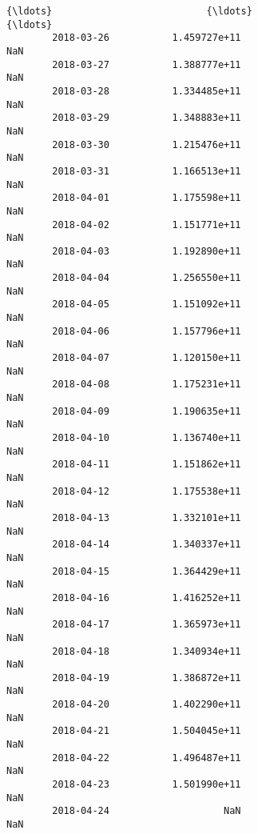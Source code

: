 \documentclass[11pt]{article}
\begin{document}
\begin{Verbatim}[commandchars=\\\{\}]
        {\ldots}                           {\ldots}                                  {\ldots}   
        2018-03-26           1.459727e+11                                  NaN   
        2018-03-27           1.388777e+11                                  NaN   
        2018-03-28           1.334485e+11                                  NaN   
        2018-03-29           1.348883e+11                                  NaN   
        2018-03-30           1.215476e+11                                  NaN   
        2018-03-31           1.166513e+11                                  NaN   
        2018-04-01           1.175598e+11                                  NaN   
        2018-04-02           1.151771e+11                                  NaN   
        2018-04-03           1.192890e+11                                  NaN   
        2018-04-04           1.256550e+11                                  NaN   
        2018-04-05           1.151092e+11                                  NaN   
        2018-04-06           1.157796e+11                                  NaN   
        2018-04-07           1.120150e+11                                  NaN   
        2018-04-08           1.175231e+11                                  NaN   
        2018-04-09           1.190635e+11                                  NaN   
        2018-04-10           1.136740e+11                                  NaN   
        2018-04-11           1.151862e+11                                  NaN   
        2018-04-12           1.175538e+11                                  NaN   
        2018-04-13           1.332101e+11                                  NaN   
        2018-04-14           1.340337e+11                                  NaN   
        2018-04-15           1.364429e+11                                  NaN   
        2018-04-16           1.416252e+11                                  NaN   
        2018-04-17           1.365973e+11                                  NaN   
        2018-04-18           1.340934e+11                                  NaN   
        2018-04-19           1.386872e+11                                  NaN   
        2018-04-20           1.402290e+11                                  NaN   
        2018-04-21           1.504045e+11                                  NaN   
        2018-04-22           1.496487e+11                                  NaN   
        2018-04-23           1.501990e+11                                  NaN   
        2018-04-24                    NaN                                  NaN   
        

\end{Verbatim}
\end{document}
